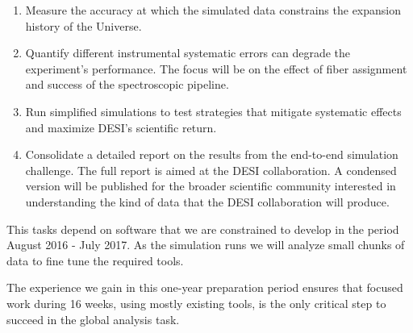 \documentclass[12pt]{article}
\begin{document}
\begin{enumerate}
\item Measure the accuracy at which the simulated data constrains the
  expansion history of the Universe.  
\item Quantify different instrumental systematic errors can degrade
  the experiment's performance. The focus will be on the effect of
  fiber assignment and success of the spectroscopic pipeline. 
\item Run simplified simulations to test strategies that mitigate
  systematic effects and maximize DESI's scientific return.
\item Consolidate a detailed report on the results from the end-to-end
  simulation challenge. 
  The full report is aimed at the DESI collaboration. A condensed
  version will be published for the broader scientific community
  interested in understanding the kind of data that the DESI
  collaboration will produce. 
\end{enumerate}

This tasks depend on software that we are constrained to develop in
the period August 2016 - July 2017. As the simulation runs we will
analyze small chunks of data to fine tune the required tools. 

The experience we gain in this one-year preparation period ensures that
focused work during 16 weeks, using mostly existing tools, is the only
critical step to succeed in the global analysis task.
\end{document}
